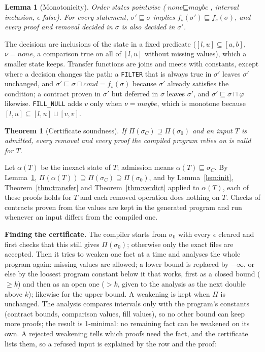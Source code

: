 \documentclass[conference]{IEEEtran}
\newtheorem{theorem}{Theorem}
\newtheorem{lemma}{Lemma}
\begin{document}
\begin{lemma}[Monotonicity]\label{lem:mono}
Order states pointwise ($\textit{none} \sqsubseteq \textit{maybe}$, interval inclusion, $\epsilon$
false). For every statement, $\sigma' \sqsubseteq \sigma$ implies $f_s(\sigma') \sqsubseteq
f_s(\sigma)$, and every proof and removal decided in $\sigma$ is also decided in $\sigma'$.
\end{lemma}
\begin{IEEEproof}
The decisions are inclusions of the state in a fixed predicate ($[l,u] \subseteq [a,b]$,
$\nu = \textit{none}$, a comparison true on all of $[l,u]$ without missing values), which a smaller
state keeps. Transfer functions are joins and meets with constants, except where a decision changes
the path: a \texttt{FILTER} that is always true in $\sigma'$ leaves $\sigma'$ unchanged, and
$\sigma' \sqsubseteq \sigma \sqcap \textit{cond} = f_s(\sigma)$ because $\sigma'$ already satisfies
the condition; a contract proven in $\sigma'$ but deferred in $\sigma$ leaves $\sigma'$, and
$\sigma' \sqsubseteq \sigma \sqcap \varphi$ likewise. \texttt{FILL\_NULL} adds $v$ only when
$\nu = \textit{maybe}$, which is monotone because $[l,u] \subseteq [l,u] \sqcup [v,v]$.
\end{IEEEproof}

\begin{theorem}[Certificate soundness]\label{thm:cert}
If $\Pi(\sigma_C) \supseteq \Pi(\sigma_0)$ and an input $T$ is admitted, every removal and every
proof the compiled program relies on is valid for $T$.
\end{theorem}
\begin{IEEEproof}
Let $\alpha(T)$ be the inexact state of $T$; admission means $\alpha(T) \sqsubseteq \sigma_C$. By
Lemma~\ref{lem:mono}, $\Pi(\alpha(T)) \supseteq \Pi(\sigma_C) \supseteq \Pi(\sigma_0)$, and by
Lemma~\ref{lem:init}, Theorem~\ref{thm:transfer} and Theorem~\ref{thm:verdict} applied to
$\alpha(T)$, each of these proofs holds for $T$ and each removed operation does nothing on $T$.
Checks of contracts proven from the values are kept in the generated program and run whenever an
input differs from the compiled one.
\end{IEEEproof}

\textbf{Finding the certificate.} The compiler starts from $\sigma_0$ with every $\epsilon$
cleared and first checks that this still gives $\Pi(\sigma_0)$; otherwise only the exact files are
accepted. Then it tries to weaken one fact at a time and analyses the whole program again: missing
values are allowed; a lower bound is replaced by $-\infty$, or else by the loosest program constant
below it that works, first as a closed bound ($\geq k$) and then as an open one ($> k$, given to the
analysis as the next double above $k$); likewise for the upper bound. A weakening is kept when
$\Pi$ is unchanged. The analysis compares intervals only with the program's constants (contract
bounds, comparison values, fill values), so no other bound can keep more proofs; the result is
1-minimal: no remaining fact can be weakened on its own. A rejected weakening tells which proofs need
the fact, and the certificate lists them, so a refused input is explained by the row and the proof:
\end{document}

